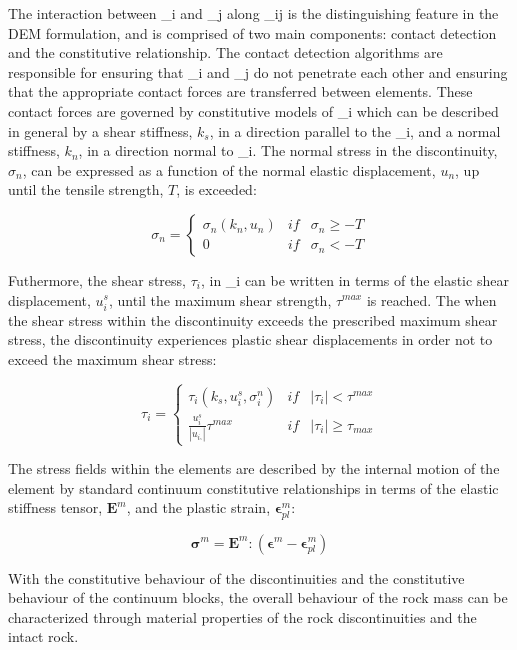
The interaction between \Omega_i and \Omega_j along \Gamma_ij is the distinguishing feature in the DEM formulation, and is comprised of two main components: contact detection and the constitutive relationship. The contact detection algorithms are responsible for ensuring that \Omega_i and \Omega_j do not penetrate each other and ensuring that the appropriate contact forces are transferred between elements. These contact forces are governed by constitutive models of \Gamma_i which can be described in general by a shear stiffness, $k_s$, in a direction parallel to the \Gamma_i, and a normal stiffness, $k_n$, in a direction normal to \Gamm_i. The normal stress in the discontinuity, $\sigma_n$, can be expressed as a function of the normal elastic displacement, $u_n$, up until the tensile strength, $T$, is exceeded: 

\begin{equation}
\sigma_n=\left\{\begin{matrix}
\sigma_n\left(k_n, u_n\right) &if&\sigma_n \geq -T\\ 
 0 & if &\sigma_n < -T
\end{matrix}\right.
\label{eqn:demnormal}
\end{equation}

Futhermore, the shear stress, $\tau_i$, in \Gamma_i can be written in terms of the elastic shear displacement, $u_i^s$, until the maximum shear strength, $\tau^{max}$ is reached. The when the shear stress within the discontinuity exceeds the prescribed maximum shear stress, the discontinuity experiences plastic shear displacements in order not to exceed the maximum shear stress:

\begin{equation}
\tau_i=\left\{\begin{matrix}
\tau_i\left(k_s,u_i^s, \sigma_i^n\right) &if&\left |\tau_i \right | < \tau^{max}\\ 
\frac{u_i^s}{\left|u_i_^s\right|}\tau^{max} & if &\left |\tau_i \right | \geq \tau_{max}
\end{matrix}\right.
\label{eqn:demshear}
\end{equation}

The stress fields within the elements are described by the internal motion of the element by standard continuum constitutive relationships in terms of the elastic stiffness tensor, $\mathbf{E}^m$, and the plastic strain, $\boldsymbol{\epsilon}^m_{pl}$:  

\begin{equation}
\boldsymbol{\sigma}^m =\mathbf{E}^m:\left(\boldsymbol{\epsilon}^m - \boldsymbol{\epsilon}^m_{pl}\right)
\label{eqn:demcont}
\end{equation}

With the constitutive behaviour of the discontinuities and the constitutive behaviour of the continuum blocks, the overall behaviour of the rock mass can be characterized through material properties of the rock discontinuities and the intact rock.